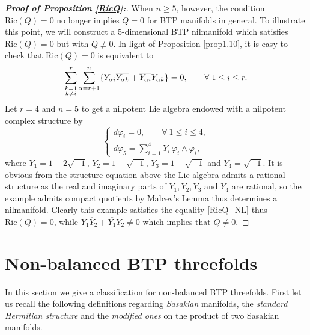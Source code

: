 \documentclass{amsart}
\numberwithin{equation}{section}
\theoremstyle{definition}
\renewcommand{\1}{\mathds{1}}
\renewcommand{\>}{\rightarrow}
\begin{document}
\begin{proof}[\bf{Proof of Proposition \ref{RicQ}:}]
When $n\geq 5$, however, the condition $\mathrm{Ric}(Q)=0$ no longer implies $Q=0$ for BTP manifolds in general. To illustrate this point, we will construct a $5$-dimensional BTP nilmanifold which satisfies $\mathrm{Ric}(Q)=0$ but with $Q \not\equiv 0$.
In light of Proposition \ref{prop1.10}, it is easy to check that $\mathrm{Ric}(Q)=0$ is equivalent to
\begin{equation}\label{RicQ_NL}
\sum_{\begin{subarray}{c} k=1 \\ k \neq i \end{subarray}}^r \sum_{\alpha = r+1}^n \{
Y_{\alpha i} \overline{Y_{\alpha k}} + \overline{Y_{\alpha i}} Y_{\alpha k} \} =0,\qquad \forall\ 1 \leq i \leq r.
\end{equation}
Let $r=4$ and $n=5$ to get a nilpotent Lie algebra endowed with a nilpotent complex structure by
\[\begin{cases}
d\varphi_i=0,   \qquad  \forall \ 1\leq i\leq 4, \\
d\varphi_{5} = \sum\limits_{i=1}^4Y_i\,\varphi_i \wedge \overline{\varphi}_i,
\end{cases}\]
where $Y_1=1+2\sqrt{-1}$, $Y_2=1-\sqrt{-1}$, $Y_3=1-\sqrt{-1}$ and $Y_4=\sqrt{-1}$.
It is obvious from the structure equation above the Lie algebra admits a rational structure
as the real and imaginary parts of $Y_1, Y_2, Y_3$ and $Y_4$ are rational,
so the example admits compact quotients by Malcev's Lemma thus determines a nilmanifold.
Clearly this example satisfies the equality \eqref{RicQ_NL} thus $\mathrm{Ric}(Q)=0$,
while $Y_1\overline{Y}_2 + \overline{Y_1}Y_2 \neq 0$ which implies that $Q \neq 0$.
\end{proof}


\vspace{0.4cm}


\section{Non-balanced BTP threefolds}\label{NBBTP}

In this section we give a classification for non-balanced BTP threefolds. First let us recall the following definitions regarding \textit{Sasakian} manifolds, the \textit{standard Hermitian structure} and the \textit{modified ones} on the product of two Sasakian manifolds.
\end{document}
